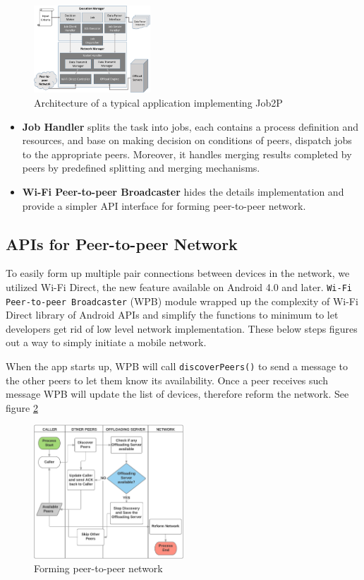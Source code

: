 \documentclass[conference]{IEEEtran}
\begin{document}
\begin{figure}[H]
\centerline {
\includegraphics[width=0.39\textwidth, natwidth=643, natheight=559]{data/jobShareArch}
}
\caption{Architecture of a typical application implementing Job2P}
\label{fig:architecture}
\end{figure}

\begin{itemize}
	\item \textbf{Job Handler} splits the task into jobs, each contains a process definition and resources, and base on making decision on conditions of peers, dispatch jobs to the appropriate peers. Moreover, it handles merging results completed by peers by predefined splitting and merging mechanisms.
	\item \textbf{Wi-Fi Peer-to-peer Broadcaster} hides the details implementation and provide a simpler API interface for forming peer-to-peer network.
\end{itemize}

\subsection{APIs for Peer-to-peer Network}
To easily form up multiple pair connections between devices in the network, we utilized Wi-Fi Direct, the new feature available on Android 4.0 and later. \texttt{Wi-Fi Peer-to-peer Broadcaster} (WPB) module wrapped up the complexity of Wi-Fi Direct library of Android APIs and simplify the functions to minimum to let developers get rid of low level network implementation. These below steps figures out a way to simply initiate a mobile network.

When the app starts up, WPB will call \texttt{discoverPeers()} to send a message to the other peers to let them know its availability. Once a peer receives such message WPB will update the list of devices, therefore reform the network. See figure \ref{fig:forming}

\begin{figure}[H]
\centerline {
\includegraphics[width=0.5\textwidth, natwidth=1127, natheight=615]{data/discoverPeers}
}
\caption{Forming peer-to-peer network}
\label{fig:forming}
\end{figure}
\end{document}
